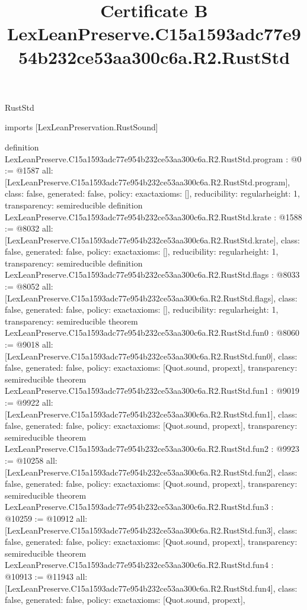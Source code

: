 \begin{lexlean}{RustStd}
\title{Certificate B LexLeanPreserve.C15a1593adc77e954b232ce53aa300c6a.R2.RustStd}
\begin{coremodule}
imports [LexLeanPreservation.RustSound]

definition LexLeanPreserve.C15a1593adc77e954b232ce53aa300c6a.R2.RustStd.program : @0 := @1587 {
  all: [LexLeanPreserve.C15a1593adc77e954b232ce53aa300c6a.R2.RustStd.program],
  class: false,
  generated: false,
  policy: exact{axioms: []},
  reducibility: regular{height: 1},
  transparency: semireducible
}
definition LexLeanPreserve.C15a1593adc77e954b232ce53aa300c6a.R2.RustStd.krate : @1588 := @8032 {
  all: [LexLeanPreserve.C15a1593adc77e954b232ce53aa300c6a.R2.RustStd.krate],
  class: false,
  generated: false,
  policy: exact{axioms: []},
  reducibility: regular{height: 1},
  transparency: semireducible
}
definition LexLeanPreserve.C15a1593adc77e954b232ce53aa300c6a.R2.RustStd.flags : @8033 := @8052 {
  all: [LexLeanPreserve.C15a1593adc77e954b232ce53aa300c6a.R2.RustStd.flags],
  class: false,
  generated: false,
  policy: exact{axioms: []},
  reducibility: regular{height: 1},
  transparency: semireducible
}
theorem LexLeanPreserve.C15a1593adc77e954b232ce53aa300c6a.R2.RustStd.fun0 : @8060 := @9018 {
  all: [LexLeanPreserve.C15a1593adc77e954b232ce53aa300c6a.R2.RustStd.fun0],
  class: false,
  generated: false,
  policy: exact{axioms: [Quot.sound, propext]},
  transparency: semireducible
}
theorem LexLeanPreserve.C15a1593adc77e954b232ce53aa300c6a.R2.RustStd.fun1 : @9019 := @9922 {
  all: [LexLeanPreserve.C15a1593adc77e954b232ce53aa300c6a.R2.RustStd.fun1],
  class: false,
  generated: false,
  policy: exact{axioms: [Quot.sound, propext]},
  transparency: semireducible
}
theorem LexLeanPreserve.C15a1593adc77e954b232ce53aa300c6a.R2.RustStd.fun2 : @9923 := @10258 {
  all: [LexLeanPreserve.C15a1593adc77e954b232ce53aa300c6a.R2.RustStd.fun2],
  class: false,
  generated: false,
  policy: exact{axioms: [Quot.sound, propext]},
  transparency: semireducible
}
theorem LexLeanPreserve.C15a1593adc77e954b232ce53aa300c6a.R2.RustStd.fun3 : @10259 := @10912 {
  all: [LexLeanPreserve.C15a1593adc77e954b232ce53aa300c6a.R2.RustStd.fun3],
  class: false,
  generated: false,
  policy: exact{axioms: [Quot.sound, propext]},
  transparency: semireducible
}
theorem LexLeanPreserve.C15a1593adc77e954b232ce53aa300c6a.R2.RustStd.fun4 : @10913 := @11943 {
  all: [LexLeanPreserve.C15a1593adc77e954b232ce53aa300c6a.R2.RustStd.fun4],
  class: false,
  generated: false,
  policy: exact{axioms: [Quot.sound, propext]},
}
\end{coremodule}
\end{lexlean}

